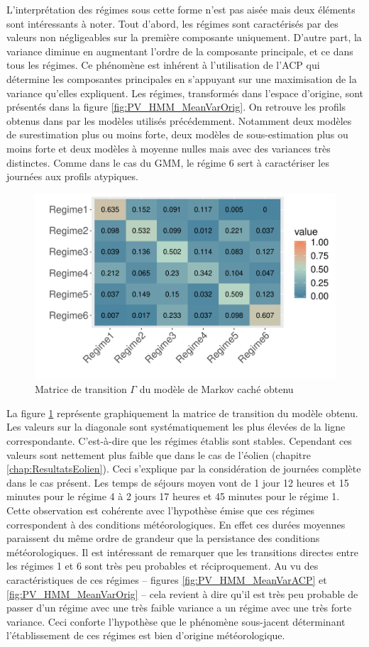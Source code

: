 \documentclass[12pt, french]{report}
\begin{document}
L'interprétation des régimes sous cette forme n'est pas aisée mais deux éléments sont intéressants à noter. Tout d'abord, les régimes sont caractérisés par des valeurs non négligeables sur la première composante uniquement. D'autre part, la variance diminue en augmentant l'ordre de la composante principale, et ce dans tous les régimes. Ce phénomène est inhérent à l'utilisation de l'ACP qui détermine les composantes principales en s'appuyant sur une maximisation de la variance qu'elles expliquent. Les régimes, transformés dans l'espace d'origine, sont présentés dans la figure \ref{fig:PV_HMM_MeanVarOrig}. On retrouve les profils obtenus dans par les modèles utilisés précédemment. Notamment deux modèles de surestimation plus ou moins forte, deux modèles de sous-estimation plus ou moins forte et deux modèles à moyenne nulles mais avec des variances très distinctes. Comme dans le cas du GMM, le régime 6 sert à caractériser les journées aux profils atypiques.

\begin{figure}[htbp]
	\centering
	\includegraphics[width = 0.65 \linewidth]{Images/PV/HMM/Transmat.pdf}
	\caption{Matrice de transition $\Gamma$ du modèle de Markov caché obtenu}
	\label{fig:PV_HMM_Transmat}
\end{figure} 


La figure \ref{fig:PV_HMM_Transmat} représente graphiquement la matrice de transition du modèle obtenu. Les valeurs sur la diagonale sont systématiquement les plus élevées de la ligne correspondante. C'est-à-dire que les régimes établis sont stables. Cependant ces valeurs sont nettement plus faible que dans le cas de l'éolien (chapitre \ref{chap:ResultatsEolien}). Ceci s'explique par la considération de journées complète dans le cas présent. Les temps de séjours moyen vont de 1 jour 12 heures et 15 minutes pour le régime 4 à 2 jours 17 heures et 45 minutes pour le régime 1. Cette observation est cohérente avec l'hypothèse émise que ces régimes correspondent à des conditions  météorologiques. En effet ces durées moyennes paraissent du même ordre de grandeur que la persistance des conditions météorologiques. Il est intéressant de remarquer que les transitions directes entre les régimes 1 et 6 sont très peu probables et réciproquement. Au vu des caractéristiques de ces régimes --  figures \ref{fig:PV_HMM_MeanVarACP} et \ref{fig:PV_HMM_MeanVarOrig}  -- cela revient à dire qu'il est très peu probable de passer d'un régime avec une très faible variance a un régime avec une très forte variance.  Ceci conforte l'hypothèse que le phénomène sous-jacent déterminant l'établissement de ces régimes est bien d'origine météorologique.
\end{document}
